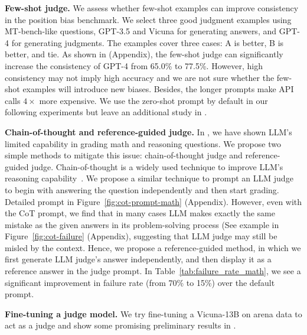 \textbf{Few-shot judge.}
We assess whether few-shot examples can improve consistency in the position bias benchmark. We select three good judgment examples using MT-bench-like questions, GPT-3.5 and Vicuna for generating answers, and GPT-4 for generating judgments. 
The examples cover three cases: A is better, B is better, and tie.
As shown in  (Appendix), the few-shot judge can significantly increase the consistency of GPT-4 from 65.0\% to 77.5\%.
However, high consistency may not imply high accuracy and we are not sure whether the few-shot examples will introduce new biases. Besides, the longer prompts make API calls $4 \times$ more expensive. We use the zero-shot prompt by default in our following experiments but leave an additional study in .

\textbf{Chain-of-thought and reference-guided judge.}
\label{subsubsec:chain-of-through-judge}
In , we have shown LLM's limited capability in grading math and reasoning questions.
We propose two simple methods to mitigate this issue: chain-of-thought judge and reference-guided judge.
Chain-of-thought is a widely used technique to improve LLM's reasoning capability~\cite{wei2022chain}.
We propose a similar technique to prompt an LLM judge to begin with answering the question independently and then start grading.
Detailed prompt in Figure~\ref{fig:cot-prompt-math} (Appendix).
However, even with the CoT prompt, we find that in many cases LLM makes exactly the same mistake as the given answers in its problem-solving process (See example in Figure~\ref{fig:cot-failure} (Appendix), suggesting that LLM judge may still be misled by the context.
Hence, we propose a reference-guided method, in which we first generate LLM judge's answer independently, and then display it as a reference answer in the judge prompt.
In Table~\ref{tab:failure_rate_math}, we see a significant improvement in failure rate  (from 70\% to 15\%) over the default prompt.

\textbf{Fine-tuning a judge model.}
\label{subsubsec:fine-tuning-judge}
We try fine-tuning a Vicuna-13B on arena data to act as a judge and show some promising preliminary results in .

